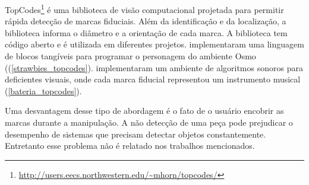 TopCodes\footnote{\url{http://users.eecs.northwestern.edu/~mhorn/topcodes/}} é uma biblioteca de visão computacional projetada para permitir rápida detecção de marcas fiduciais. Além da identificação e da localização, a biblioteca informa o diâmetro e a orientação de cada marca. A biblioteca tem código aberto e é utilizada em diferentes projetos.  implementaram uma linguagem de blocos tangíveis para programar o personagem do ambiente Osmo ((\autoref{strawbies_topcodes}).  implementaram um ambiente de algoritmos sonoros para deficientes visuais, onde cada marca fiducial representou um instrumento musical (\autoref{bateria_topcodes}).

Uma desvantagem desse tipo de abordagem é o fato de o usuário encobrir as marcas durante a manipulação. A não detecção de uma peça pode prejudicar o desempenho de sistemas que precisam detectar objetos constantemente. Entretanto esse problema não é relatado nos trabalhos mencionados.

